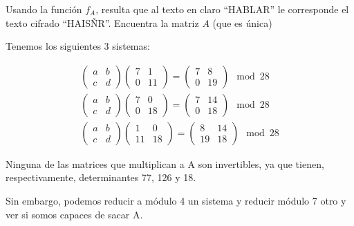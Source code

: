 \begin{problem}[2]
Usando la función $f_A$, resulta que al texto en claro ``HABLAR'' le corresponde el texto cifrado ``HAISÑR''. Encuentra la matriz $A$ (que es única)

\solution
{}

Tenemos los siguientes 3 sistemas:

\begin{align*}
\left( \begin{array}{cc}
  a & b \\
  c & d
  \end{array} \right)
\left( \begin{array}{cc}
  7 & 1 \\
  0 & 11
  \end{array} \right)
  =
  \left( \begin{array}{cc}
  7 & 8 \\
  0 & 19
  \end{array} \right) \mod 28\\
\left( \begin{array}{cc}
  a & b \\
  c & d
  \end{array} \right)
\left( \begin{array}{cc}
  7 & 0 \\
  0 & 18
  \end{array} \right)
  =
  \left( \begin{array}{cc}
  7 & 14 \\
  0 & 18
  \end{array} \right) \mod 28\\
\left( \begin{array}{cc}
  a & b \\
  c & d
  \end{array} \right)
\left( \begin{array}{cc}
  1 & 0 \\
  11 & 18
  \end{array} \right)
  =
  \left( \begin{array}{cc}
  8 & 14 \\
  19 & 18
  \end{array} \right) \mod 28
\end{align*}

Ninguna de las matrices que multiplican a A son invertibles, ya que tienen, respectivamente, determinantes 77, 126 y 18.

Sin embargo, podemos reducir a módulo 4 un sistema y reducir módulo 7 otro y ver si somos capaces de sacar A.


\end{problem}
